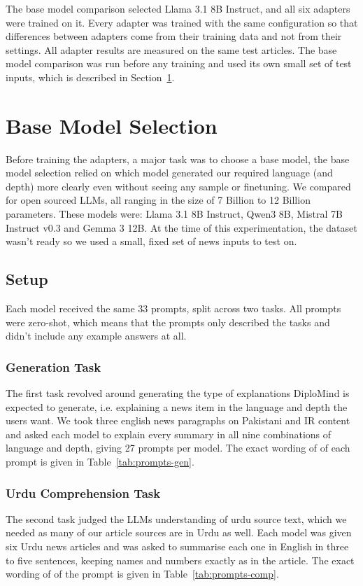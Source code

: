 \documentclass{FastFyp}
\begin{document}
The base model comparison selected Llama 3.1 8B Instruct, and all six adapters were trained on it. Every adapter was trained with the same configuration so that differences between adapters come from their training data and not from their settings. All adapter results are measured on the same test articles. The base model comparison was run before any training and used its own small set of test inputs, which is described in Section~\ref{sec:base-selection}.

\section{Base Model Selection}
\label{sec:base-selection}
Before training the adapters, a major task was to choose a base model, the base model  selection relied on which model generated our required language (and depth) more clearly even without seeing any sample or finetuning. We compared for open sourced LLMs, all ranging in the size of 7 Billion to 12 Billion parameters. These models were: Llama 3.1 8B Instruct, Qwen3 8B, Mistral 7B Instruct v0.3 and Gemma 3 12B. At the time of this experimentation, the dataset wasn't ready so we used a small, fixed set of news inputs to test on.

\subsection{Setup}
Each model received the same 33 prompts, split across two tasks. All prompts were zero-shot, which means that the prompts only described the tasks and didn't include any example answers at all.

\subsubsection{Generation Task}
The first task revolved around generating the type of explanations DiploMind is expected to generate, i.e. explaining a news item in the language and depth the users want. We took three english news paragraphs on Pakistani and IR content and asked each model to explain every summary in all nine combinations of language and depth, giving 27 prompts per model. The exact wording of of each prompt is given in Table~\ref{tab:prompts-gen}.

\subsubsection{Urdu Comprehension Task}
The second task judged the LLMs understanding of urdu source text, which we needed as many of our article sources are in Urdu as well. Each model was given six Urdu news articles and was asked to summarise each one in English in three to five sentences, keeping names and numbers exactly as in the article. The exact wording of of the prompt is given in Table~\ref{tab:prompts-comp}.
\end{document}
